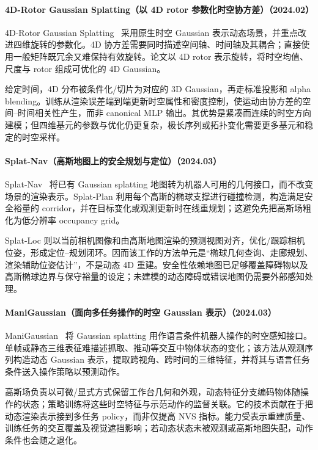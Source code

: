 \paragraph{4D-Rotor Gaussian Splatting（以 4D rotor 参数化时空协方差）（2024.02）}
4D-Rotor Gaussian Splatting~\cite{2402_03307} 采用原生时空 Gaussian 表示动态场景，并重点改进四维旋转的参数化。4D 协方差需要同时描述空间轴、时间轴及其耦合；直接使用一般矩阵既冗余又难保持有效旋转。论文以 4D rotor 表示旋转，将时空均值、尺度与 rotor 组成可优化的 4D Gaussian。

给定时间，4D 分布被条件化/切片为对应的 3D Gaussian，再走标准投影和 alpha blending。训练从渲染误差端到端更新时空属性和密度控制，使运动由协方差的空间--时间相关性产生，而非 canonical MLP 输出。其优势是紧凑而连续的时空方向建模；但四维基元的参数与优化仍更复杂，极长序列或拓扑变化需要更多基元和稳定的时空采样。

\paragraph{Splat-Nav（高斯地图上的安全规划与定位）（2024.03）}
Splat-Nav~\cite{2403_02751} 将已有 Gaussian splatting 地图转为机器人可用的几何接口，而不改变场景的渲染表示。Splat-Plan 利用每个高斯的椭球支撑进行碰撞检测，构造满足安全裕量的 corridor，并在目标变化或观测更新时在线重规划；这避免先把高斯场粗化为低分辨率 occupancy grid。

Splat-Loc 则以当前相机图像和由高斯地图渲染的预测视图对齐，优化/跟踪相机位姿，形成定位--规划闭环。因而该工作的方法单元是“椭球几何查询、走廊规划、渲染辅助位姿估计”，不是动态 4D 重建。安全性依赖地图已足够覆盖障碍物以及高斯椭球边界与保守裕量的设定；未建模的动态障碍或错误地图仍需要外部感知处理。

\paragraph{ManiGaussian（面向多任务操作的时空 Gaussian 表示）（2024.03）}
ManiGaussian~\cite{2403_08321} 将 Gaussian splatting 用作语言条件机器人操作的时空感知接口。单帧或静态三维表征难描述抓取、推动等交互中物体状态的变化；该方法从观测序列构造动态 Gaussian 表示，提取跨视角、跨时间的三维特征，并将其与语言任务条件送入操作策略以预测动作。

高斯场负责以可微/显式方式保留工作台几何和外观，动态特征分支编码物体随操作的状态；策略训练将这些时空特征与示范动作的监督关联。它的技术贡献在于把动态渲染表示接到多任务 policy，而非仅提高 NVS 指标。能力受表示重建质量、训练任务的交互覆盖及视觉遮挡影响；若动态状态未被观测或高斯地图失配，动作条件也会随之退化。

